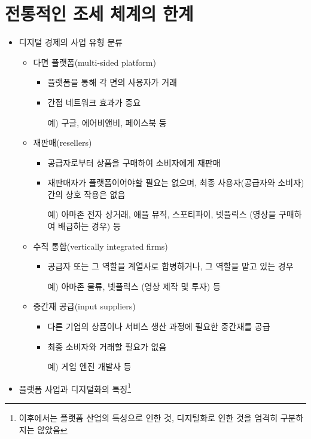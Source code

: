 \section{전통적인 조세 체계의 한계}\label{sec:}
\begin{itemize}
\item 디지털 경제의 사업 유형 분류 \citep{Hagiu:2015wg}
	\begin{itemize}
	\item 다면 플랫폼(multi-sided platform)
		\begin{itemize}
		\item 플랫폼을 통해 각 면의 사용자가 거래
		\item 간접 네트워크 효과가 중요
		\item[예)] 구글, 에어비앤비, 페이스북 등
		\end{itemize} 
	\item 재판매(resellers)
		\begin{itemize}
		\item 공급자로부터 상품을 구매하여 소비자에게 재판매
		\item 재판매자가 플랫폼이어야할 필요는 없으며, 최종 사용자(공급자와 소비자) 간의 상호 작용은 없음
		\item[예)] 아마존 전자 상거래, 애플 뮤직, 스포티파이, 넷플릭스 (영상을 구매하여 배급하는 경우) 등
		\end{itemize}
	\item 수직 통합(vertically integrated firms)
		\begin{itemize}
		\item 공급자 또는 그 역할을 계열사로 합병하거나, 그 역할을 맡고 있는 경우
		\item[예)] 아마존 물류, 넷플릭스 (영상 제작 및 투자) 등
		\end{itemize}
	\item 중간재 공급(input suppliers)
		\begin{itemize}
		\item 다른 기업의 상품이나 서비스 생산 과정에 필요한 중간재를 공급
		\item 최종 소비자와 거래할 필요가 없음
		\item[예)] 게임 엔진 개발사 등
		\end{itemize}
	\end{itemize}
\item 플랫폼 사업과 디지털화의 특징\footnote{이후에서는 플랫폼 산업의 특성으로 인한 것, 디지털화로 인한 것을 엄격히 구분하지는 않았음} \cite[ch. 2]{OECD/G20-Base-Erosion-and-Profit-Shifting-Project:2018to}
	\begin{itemize}

\end{itemize}
\end{itemize}

